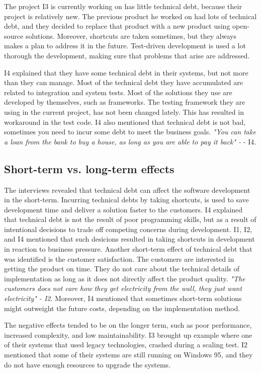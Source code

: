 The project I3 is currently working on has little technical debt, because their project is relatively new. The previous product he worked on had lots of technical debt, and they decided to replace that product with a new product using open-source solutions. Moreover, shortcuts are taken sometimes, but they always makes a plan to address it in the future. Test-driven development is used a lot thorough the development, making sure that problems that arise are addressed.

I4 explained that they have some technical debt in their systems, but not more than they can manage. Most of the technical debt they have accumulated are related to integration and system tests. Most of the solutions they use are developed by themselves, such as frameworks. The testing framework they are using in the current project, has not been changed lately. This has resulted in workaround in the test code. I4 also mentioned that technical debt is not bad, sometimes you need to incur some debt to meet the business goals. \textit{"You can take a loan from the bank to buy a house, as long as you are able to pay it back" - } - I4.



\subsection{Short-term vs. long-term effects}
The interviews revealed that technical debt can affect the software development in the short-term. Incurring technical debts by taking shortcuts, is used to save development time and deliver a solution faster to the customers. I4 explained that technical debt is not the result of poor programming skills, but as a result of intentional decisions to trade off competing concerns during development. I1, I2, and I4 mentioned that such desicions resulted in taking shortcuts in development in reaction to business pressure. Another short-term effect of technical debt that was identified is the customer satisfaction. The customers are interested in getting the product on time. They do not care about the technical details of implementation as long as it does not directly affect the product quality. \textit{"The customers does not care how they get electricity from the wall, they just want electricity" - I2}. Moreover, I4 mentioned that sometimes short-term solutions might outweight the future costs, depending on the implementation method.

The negative effects tended to be on the longer term, such as poor performance, increased complexity, and low maintainability. I3 brought up example where one of their systems that used legacy technologies, crashed during a scaling test. I2 mentioned that some of their systems are still running on Windows 95, and they do not have enough resources to upgrade the systems. 




